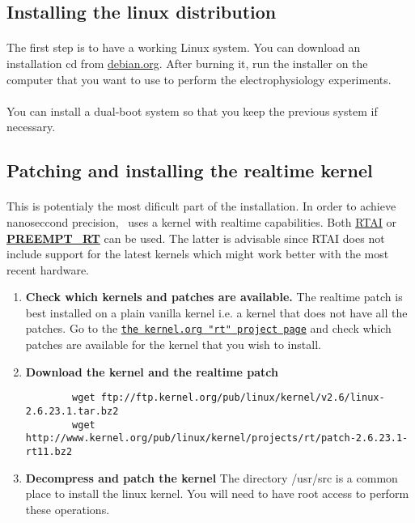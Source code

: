 \subsection{Installing the linux distribution} 
\label{install:linux}
\paragraph{}
The first step is to have a working Linux system. 
You can download an installation cd from \href{http://www.debian.org/distrib}{debian.org}. After burning it, run the installer on the computer that you want to use to perform the electrophysiology experiments. 
\paragraph{}
You can install a dual-boot system so that you keep the previous system if necessary.

\subsection{Patching and installing the realtime kernel} 
\label{install:kernel}
\paragraph{}
This is potentialy the most dificult part of the installation. In order to achieve nanoseccond precision, \progname\ uses a kernel with realtime capabilities. Both \href{http://www.rtai.org}{RTAI} or \textbf{\href{https://rt.wiki.kernel.org/index.php/Main\_Page}{PREEMPT\_RT}} can be used. The latter is advisable since RTAI does not include support for the latest kernels which might work better with the most recent hardware.

\begin{enumerate}
\item \textbf{Check which kernels and patches are available.} The realtime patch is best installed on a plain vanilla kernel i.e. a kernel that does not have all the patches.
Go to the \texttt{\href{http://www.kernel.org/pub/linux/kernel/projects/rt/}{the kernel.org "rt" project page}} and check which patches are available for the kernel that you wish to install. 
\item \textbf{Download the kernel and the realtime patch}
	\begin{verbatim}
		wget ftp://ftp.kernel.org/pub/linux/kernel/v2.6/linux-2.6.23.1.tar.bz2 
		wget http://www.kernel.org/pub/linux/kernel/projects/rt/patch-2.6.23.1-rt11.bz2
	\end{verbatim}
\item \textbf{Decompress and patch the kernel} The directory /usr/src is a common place to install the linux kernel. You will need to have root access to perform these operations.
\end{enumerate}

